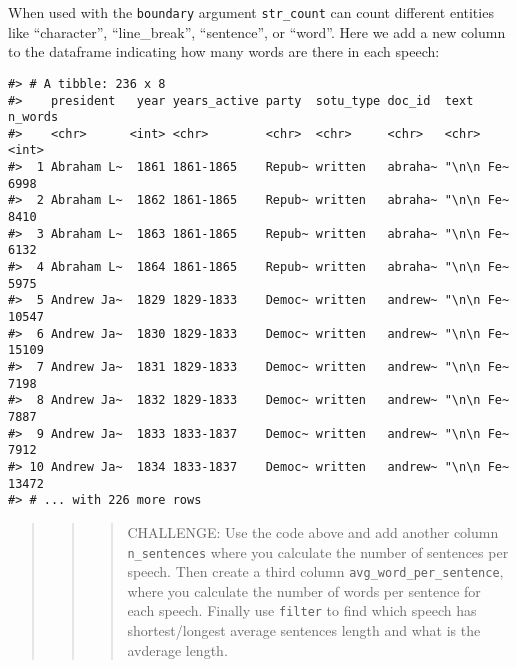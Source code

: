 \documentclass[]{book}
\newenvironment{Shaded}{\begin{snugshade}}{\end{snugshade}}
\newcommand{\DataTypeTok}[1]{\textcolor[rgb]{0.13,0.29,0.53}{#1}}
\newcommand{\KeywordTok}[1]{\textcolor[rgb]{0.13,0.29,0.53}{\textbf{#1}}}
\newcommand{\NormalTok}[1]{#1}
\newcommand{\OperatorTok}[1]{\textcolor[rgb]{0.81,0.36,0.00}{\textbf{#1}}}
\newcommand{\StringTok}[1]{\textcolor[rgb]{0.31,0.60,0.02}{#1}}
\begin{document}
When used with the \texttt{boundary} argument \texttt{str\_count} can count different entities like ``character'', ``line\_break'', ``sentence'', or ``word''. Here we add a new column to the dataframe indicating how many words are there in each speech:

\begin{Shaded}
\end{Shaded}

\begin{verbatim}
#> # A tibble: 236 x 8
#>    president   year years_active party  sotu_type doc_id  text      n_words
#>    <chr>      <int> <chr>        <chr>  <chr>     <chr>   <chr>       <int>
#>  1 Abraham L~  1861 1861-1865    Repub~ written   abraha~ "\n\n Fe~    6998
#>  2 Abraham L~  1862 1861-1865    Repub~ written   abraha~ "\n\n Fe~    8410
#>  3 Abraham L~  1863 1861-1865    Repub~ written   abraha~ "\n\n Fe~    6132
#>  4 Abraham L~  1864 1861-1865    Repub~ written   abraha~ "\n\n Fe~    5975
#>  5 Andrew Ja~  1829 1829-1833    Democ~ written   andrew~ "\n\n Fe~   10547
#>  6 Andrew Ja~  1830 1829-1833    Democ~ written   andrew~ "\n\n Fe~   15109
#>  7 Andrew Ja~  1831 1829-1833    Democ~ written   andrew~ "\n\n Fe~    7198
#>  8 Andrew Ja~  1832 1829-1833    Democ~ written   andrew~ "\n\n Fe~    7887
#>  9 Andrew Ja~  1833 1833-1837    Democ~ written   andrew~ "\n\n Fe~    7912
#> 10 Andrew Ja~  1834 1833-1837    Democ~ written   andrew~ "\n\n Fe~   13472
#> # ... with 226 more rows
\end{verbatim}

\begin{quote}
\begin{quote}
\begin{quote}
CHALLENGE: Use the code above and add another column \texttt{n\_sentences} where you calculate the number of sentences per speech. Then create a third column \texttt{avg\_word\_per\_sentence}, where you calculate the number of words per sentence for each speech. Finally use \texttt{filter} to find which speech has shortest/longest average sentences length and what is the avderage length.
\end{quote}
\end{quote}
\end{quote}
\end{document}
